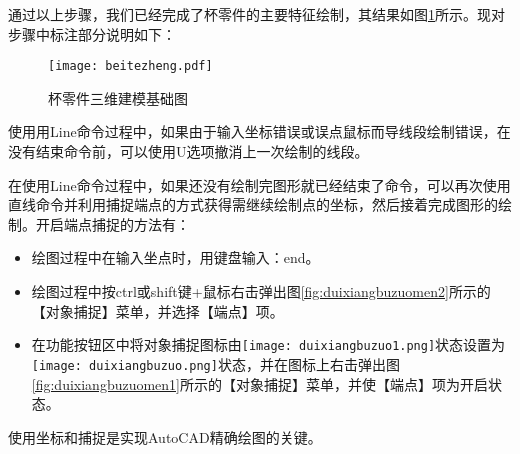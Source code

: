 通过以上步骤，我们已经完成了杯零件的主要特征绘制，其结果如图\ref{fig:bettezheng}所示。现对步骤中标注部分说明如下：
\showremarks
\noindent
\begin{figure}[htbp]
\centering
\texttt{[image: beitezheng.pdf]}
\caption{杯零件三维建模基础图}\label{fig:bettezheng}
\end{figure}

\begin{tips}
\item 使用用Line命令过程中，如果由于输入坐标错误或误点鼠标而导线段绘制错误，在没有结束命令前，可以使用U选项撤消上一次绘制的线段。
\item 在使用Line命令过程中，如果还没有绘制完图形就已经结束了命令，可以再次使用直线命令并利用捕捉端点的方式获得需继续绘制点的坐标，然后接着完成图形的绘制。开启端点捕捉的方法有：
\begin{itemize}
\item 绘图过程中在输入坐点时，用键盘输入：end。
\item 绘图过程中按ctrl或shift键+鼠标右击弹出图\ref{fig:duixiangbuzuomen2}所示的【对象捕捉】菜单，并选择【端点】项。
\item 在功能按钮区中将对象捕捉图标由\texttt{[image: duixiangbuzuo1.png]}状态设置为\texttt{[image: duixiangbuzuo.png]}状态，并在图标上右击弹出图\ref{fig:duixiangbuzuomen1}所示的【对象捕捉】菜单，并使【端点】项为开启状态。
\end{itemize}
\item 使用坐标和捕捉是实现AutoCAD精确绘图的关键。
\end{tips}
\begin{figure}[htbp]
\centering
\begin{floatrow}
\end{floatrow}
\end{figure}

